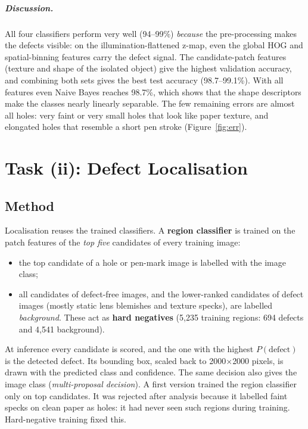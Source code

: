 \documentclass[11pt,a4paper]{report}
\begin{document}
\paragraph{Discussion.}
All four classifiers perform very well (94--99\%) \emph{because} the pre-processing makes the
defects visible: on the illumination-flattened z-map, even the global HOG and spatial-binning
features carry the defect signal. The candidate-patch features (texture and shape of the
isolated object) give the highest validation accuracy, and combining both sets gives the best
test accuracy (98.7--99.1\%). With all features even Naive Bayes reaches 98.7\%, which shows
that the shape descriptors make the classes nearly linearly separable. The few remaining
errors are almost all holes: very faint or very small holes that look like paper texture, and
elongated holes that resemble a short pen stroke (Figure~\ref{fig:err}).

\chapter{Task (ii): Defect Localisation}
\section{Method}
Localisation reuses the trained classifiers. A \textbf{region classifier} is trained on the
patch features of the \emph{top five} candidates of every training image:
\begin{itemize}
  \item the top candidate of a hole or pen-mark image is labelled with the image class;
  \item all candidates of defect-free images, and the lower-ranked candidates of defect
        images (mostly static lens blemishes and texture specks), are labelled
        \emph{background}. These act as \textbf{hard negatives} (5,235 training regions:
        694 defects and 4,541 background).
\end{itemize}
At inference every candidate is scored, and the one with the highest $P(\text{defect})$ is the
detected defect. Its bounding box, scaled back to 2000$\times$2000 pixels, is drawn with the
predicted class and confidence. The same decision also gives the image class
(\emph{multi-proposal decision}). A first version trained the region classifier only on top
candidates. It was rejected after analysis because it labelled faint specks on clean paper
as holes: it had never seen such regions during training. Hard-negative training fixed this.
\end{document}
